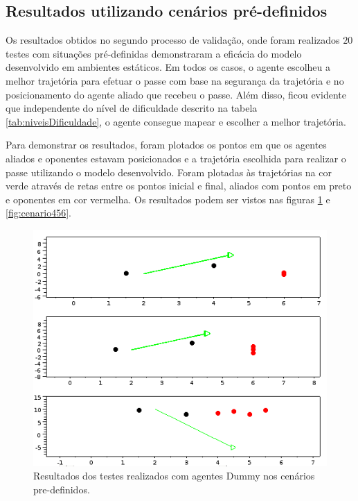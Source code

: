 \subsection{Resultados utilizando cenários pré-definidos}
Os resultados obtidos no segundo processo de validação, onde foram realizados $20$ testes com situações pré-definidas 
demonstraram a eficácia do modelo desenvolvido em ambientes estáticos. Em todos os casos, o agente escolheu a melhor 
trajetória para efetuar o passe com base na segurança da trajetória e no posicionamento do agente aliado que recebeu o passe. 
Além disso, ficou evidente que independente do nível de dificuldade descrito na tabela \ref{tab:niveisDificuldade}, o 
agente consegue mapear e escolher a melhor trajetória.

Para demonstrar os resultados, foram plotados os pontos em que os agentes aliados e oponentes estavam posicionados e a
trajetória escolhida para realizar o passe utilizando o modelo desenvolvido. Foram plotadas \`as trajetórias na cor verde através 
de retas entre os pontos inicial e final, aliados com pontos em preto e oponentes em cor vermelha. Os resultados podem ser 
vistos nas figuras \ref{fig:cenario123} e \ref{fig:cenario456}.


\begin{figure}[H]
\centering
{}
\includegraphics[scale=0.6]{figuras/cenario123.png}
\caption{Resultados dos testes realizados com agentes Dummy nos cenários pre-definidos.} 
\label{fig:cenario123}
\end{figure}
\FloatBarrier


